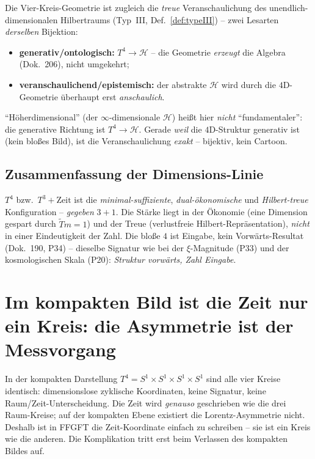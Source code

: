 Die Vier-Kreis-Geometrie ist zugleich die \emph{treue} Veranschaulichung des
unendlich-dimensionalen Hilbertraums (Typ~III, Def.~\ref{def:typeIII}) -- zwei
Lesarten \emph{derselben} Bijektion:
\begin{itemize}
  \item \textbf{generativ/ontologisch:} $T^4 \to \mathcal{H}$ -- die Geometrie
  \emph{erzeugt} die Algebra (Dok.~206), nicht umgekehrt;
  \item \textbf{veranschaulichend/epistemisch:} der abstrakte $\mathcal{H}$ wird
  durch die $4$D-Geometrie \"uberhaupt erst \emph{anschaulich}.
\end{itemize}
\enquote{H\"oherdimensional} (der $\infty$-dimensionale $\mathcal{H}$) hei\ss t
hier \emph{nicht} \enquote{fundamentaler}: die generative Richtung ist
$T^4 \to \mathcal{H}$. Gerade \emph{weil} die $4$D-Struktur generativ ist (kein
blo\ss es Bild), ist die Veranschaulichung \emph{exakt} -- bijektiv, kein Cartoon.

\subsection{Zusammenfassung der Dimensions-Linie}

\begin{important}
$T^4$ bzw.\ $T^3+\text{Zeit}$ ist die \emph{minimal-suffiziente},
\emph{dual-\"okonomische} und \emph{Hilbert-treue} Konfiguration -- \emph{gegeben}
$3+1$. Die St\"arke liegt in der \"Okonomie (eine Dimension gespart durch
$\tilde T m=1$) und der Treue (verlustfreie Hilbert-Repr\"asentation), \emph{nicht}
in einer Eindeutigkeit der Zahl. Die blo\ss e $4$ ist Eingabe, kein
Vorw\"arts-Resultat (Dok.~190, P34) -- dieselbe Signatur wie bei der
$\xi$-Magnitude (P33) und der kosmologischen Skala (P20): \emph{Struktur
vorw\"arts, Zahl Eingabe}.
\end{important}

\section{Im kompakten Bild ist die Zeit nur ein Kreis: die Asymmetrie ist der Messvorgang}\label{sec:zeitkreis}

In der kompakten Darstellung $T^4 = S^1\times S^1\times S^1\times S^1$ sind alle vier
Kreise identisch: dimensionslose zyklische Koordinaten, keine Signatur, keine
Raum/Zeit-Unterscheidung. Die Zeit wird \emph{genauso} geschrieben wie die drei
Raum-Kreise; auf der kompakten Ebene existiert die Lorentz-Asymmetrie nicht. Deshalb
ist in FFGFT die Zeit-Koordinate einfach zu schreiben -- sie ist ein Kreis wie die
anderen. Die Komplikation tritt erst beim Verlassen des kompakten Bildes auf.

